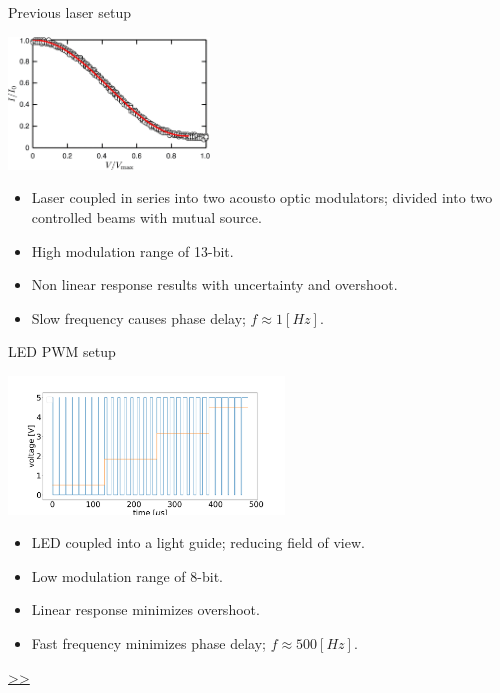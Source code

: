 \documentclass{beamer}
\begin{document}
\begin{frame}{Previous laser setup}
	\begin{center}		
		\includegraphics[width=0.4\textwidth,keepaspectratio]{aom1.png}
	\end{center}
	\begin{itemize}		
		\item Laser coupled in series into two acousto optic modulators; divided into two controlled beams with mutual source.
		\item High modulation range of 13-bit.
		\item Non linear response results with uncertainty and overshoot.
		\item Slow frequency causes phase delay; $f \approx 1 [Hz]$.
	\end{itemize}
\end{frame}

\begin{frame}{\hypertarget{frame:LED PWM setup}{LED PWM setup}}

	\begin{center}		
		\includegraphics[width=0.55\textwidth,keepaspectratio]{duty_cycle.png}
	\end{center}
	\begin{itemize}		
		\item LED coupled into a light guide; reducing field of view.
		\item Low modulation range of 8-bit.
		\item Linear response minimizes overshoot.
		\item Fast frequency minimizes phase delay; $f \approx 500[Hz]$.
		
		
	\end{itemize}
	\hyperlink{frame:LED PWM setup 1}{>>} 
\end{frame}
\end{document}
